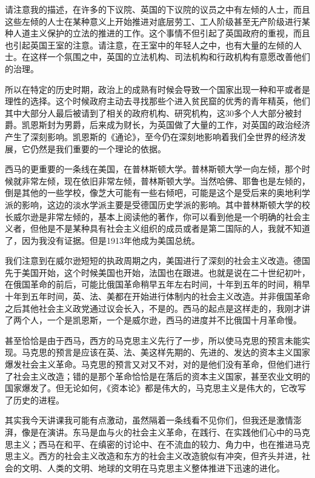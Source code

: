 \documentclass[UTF8, 12pt, a4paper]{ctexrep}
\begin{document}
请注意我的描述，在许多的下议院、英国的下议院的议员之中有左倾的人士，而且这些左倾的人士在某种意义上开始推进对底层劳工、工人阶级甚至无产阶级进行某种人道主义保护的立法的推进的工作。这个事情不但引起了英国政府的重视，而且也引起英国王室的注意。请注意，在王室中的年轻人之中，也有大量的左倾的人士。在这样一个氛围之中，英国的立法机构、司法机构和行政机构有意愿改善他们的治理。

所以在特定的历史时期，政治上的成熟有时候会导致一个国家出现一种和平或者是理性的选择。这个时候政府主动去寻找那些个进入贫民窟的优秀的青年精英，他们其中大部分人最后被请到了相关的政府机构、研究机构，这30多个人大部分被封爵。凯恩斯封为男爵，后来成为财长，为英国做了大量的工作，对英国的政治经济产生了深刻影响。凯恩斯的《通论》，至今仍在深刻地影响着我们全世界的经济发展，它仍然是我们重要的一个理论的依据。

西马的更重要的一条线在美国，在普林斯顿大学。普林斯顿大学一向左倾，那个时候就非常左倾，现在依旧非常左倾，普林斯顿大学。当然哈佛、耶鲁也是左倾的，倒是其他的一些学校，像芝大可能有一些右倾吧，可能是这个是受后来的奥地利学派的影响，这边的淡水学派主要是受德国历史学派的影响。其中普林斯顿大学的校长威尔逊是非常左倾的，基本上阅读他的著作，你可以看到他是一个明确的社会主义者，但他是不是某种具有社会主义组织的成员或者是第二国际的人，我就不知道了，因为我没有证据。但是1913年他成为美国总统。

我们注意到在威尔逊短短的执政周期之内，美国进行了深刻的社会主义改造。德国先于美国开始，这个时候美国也开始，法国也在跟进。也就是说在二十世纪初叶，在俄国革命的前后，可能比俄国革命稍早五年左右时间，十年到五年的时间，稍早十年到五年时间，英、法、美都在开始进行体制内的社会主义改造。并非俄国革命之后其他社会主义政党通过议会长入，不是的。西马的起点是这样走的，我刚才讲了两个人，一个是凯恩斯，一个是威尔逊，西马的进度并不比俄国十月革命慢。

甚至恰恰是由于西马，西方的马克思主义先行了一步，所以使马克思的预言未能实现。马克思的预言是应该在英、法、美这样先期的、先进的、发达的资本主义国家爆发社会主义革命。马克思的预言又对又不对，对的是他们没有革命，但他们进行了社会主义改造；错的是那个革命恰恰是在落后的资本主义国家，甚至农业文明的国家爆发了。但无论如何，《资本论》都是伟大的，马克思主义是伟大的，它改写了历史的进程。

其实我今天讲课我可能有点激动，虽然隔着一条线看不见你们，但我还是激情澎湃，像是在演讲。东马是血与火的社会主义革命，在践行、在实践他们心中的马克思主义；西马在和平、在缜密的讨论中、在不流血的较力、角力中，也在推进马克思主义。西方的社会主义改造和东方的社会主义改造貌似有冲突，但齐头并进，社会的文明、人类的文明、地球的文明在马克思主义整体推进下迅速的进化。
\end{document}
